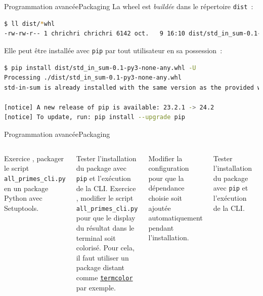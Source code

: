 \documentclass{beamer}
\begin{document}
    \begin{frame}[fragile]{Programmation avancée}{Packaging}
        La wheel est \textit{buildée} dans le répertoire \lstinline{dist}~:
        \begin{lstlisting}[language=bash]
$ ll dist/*whl
-rw-rw-r-- 1 chrichri chrichri 6142 oct.   9 16:10 dist/std_in_sum-0.1-py3-none-any.whl
        \end{lstlisting}
        \bigbreak
        Elle peut être installée avec \lstinline{pip} par tout utilisateur en sa possession~:
        \begin{lstlisting}[language=bash]
$ pip install dist/std_in_sum-0.1-py3-none-any.whl -U
Processing ./dist/std_in_sum-0.1-py3-none-any.whl
std-in-sum is already installed with the same version as the provided wheel. Use --force-reinstall to force an installation of the wheel.

[notice] A new release of pip is available: 23.2.1 -> 24.2
[notice] To update, run: pip install --upgrade pip
        \end{lstlisting}
    \end{frame}

    \begin{frame}{Programmation avancée}{Packaging}
        \begin{columns}
            Exercice \execcounterdispinc{}, packager le script \lstinline{all_primes_cli.py} en un package Python avec Setuptools.

            Tester l'installation du package avec \lstinline{pip} et l'exécution de la CLI.
            \bigbreak
            Exercice \execcounterdispinc{}, modifier le script \lstinline{all_primes_cli.py} pour que le display du résultat dans le terminal soit colorisé.
            Pour cela, il faut utiliser un package distant comme \href{https://pypi.org/project/termcolor/}{\lstinline{termcolor}} par exemple.

            Modifier la configuration pour que la dépendance choisie soit ajoutée automatiquement pendant l'installation.

            Tester l'installation du package avec \lstinline{pip} et l'exécution de la CLI.
            \begin{center}
                \includegraphics[width=4cm]{image/python-luggage}
            \end{center}
        \end{columns}
    \end{frame}
\end{document}
